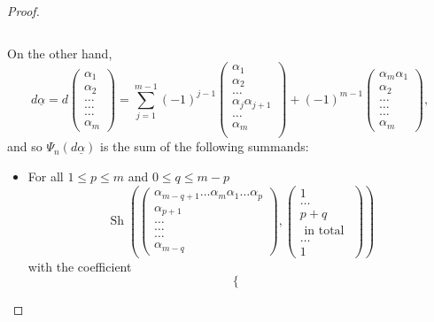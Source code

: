 \documentclass[12pt,a4paper,reqno]{amsart}
\DeclareMathOperator{\shfl}{{\mathrm{Sh}}}
\begin{document}
\begin{proof}
\begin{itemize}
$$$$
\end{itemize}
On the other hand, 
\begin{equation}
d\underline{\alpha} 
= d \left(
\begin{matrix}
\alpha_1 \\ 
\alpha_2 \\
\dots \\ 
\dots \\
\dots \\ 
\alpha_m 
\end{matrix}
\right)
 = \sum_{j=1}^{m-1} 
(-1)^{j-1}
\left(
\begin{matrix}
\alpha_1 \\
\alpha_2 \\
\dots  \\
\alpha_j \alpha_{j+1} \\ 
\dots \\ 
\alpha_m \\
\end{matrix}
\right)
+ 
(-1)^{m-1}
\left(
\begin{matrix}
\alpha_m \alpha_1 \\
\alpha_2 \\
\dots \\
\dots \\
\dots \\
\alpha_m 
\end{matrix}
\right),
\end{equation}
and so $\Psi_n(d\underline\alpha)$ is the sum of the following summands:
\begin{itemize}
\item For all $1 \leq p \leq m$ and $0 \leq q \leq m-p$ 
$$ \shfl\left(
\left(
\begin{matrix}
\alpha_{m-q+1} \dots \alpha_m \alpha_1 \dots \alpha_p \\
\alpha_{p+1} \\
\dots \\
\dots \\
\dots \\
\alpha_{m-q} 
\end{matrix}
\right), 
\left(
\begin{matrix}
1 \\
\dots \\
p+q \\
\text{ in total } \\
\dots \\
1
\end{matrix}
\right)
\right) $$
with the coefficient
$$
\begin{cases}

\end{cases}$$
\end{itemize}
\end{proof}
\end{document}
